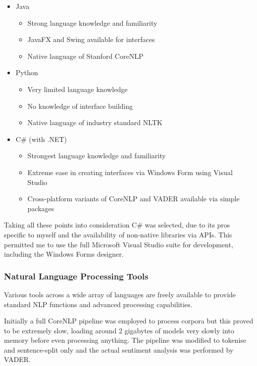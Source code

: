 \documentclass{article}
\begin{document}
        \begin{itemize}
            \item Java
            \begin{itemize}
                \item Strong language knowledge and familiarity
                \item JavaFX and Swing available for interfaces
                \item Native language of Stanford CoreNLP
            \end{itemize}
            \item Python
            \begin{itemize}
                \item Very limited language knowledge
                \item No knowledge of interface building
                \item Native language of industry standard NLTK
            \end{itemize}
            \item C\# (with .NET)
            \begin{itemize}
                \item Strongest language knowledge and familiarity
                \item Extreme ease in creating interfaces via Windows Form using Visual Studio
                \item Cross-platform variants of CoreNLP and VADER available via simple packages
            \end{itemize}
        \end{itemize}
        Taking all these points into consideration C\# was selected, due to its pros specific to myself and the availability of non-native libraries via APIs. This permitted me to use the full Microsoft Visual Studio suite for development, including the Windows Forms designer.
        \subsubsection{Natural Language Processing Tools}
        Various tools across a wide array of languages are freely available to provide standard NLP functions and advanced processing capabilities.

        Initially a full CoreNLP pipeline was employed to process corpora but this proved to be extremely slow, loading around 2 gigabytes of models very slowly into memory before even processing anything. The pipeline was modified to tokenise and sentence-split only and the actual sentiment analysis was performed by VADER.
\end{document}
